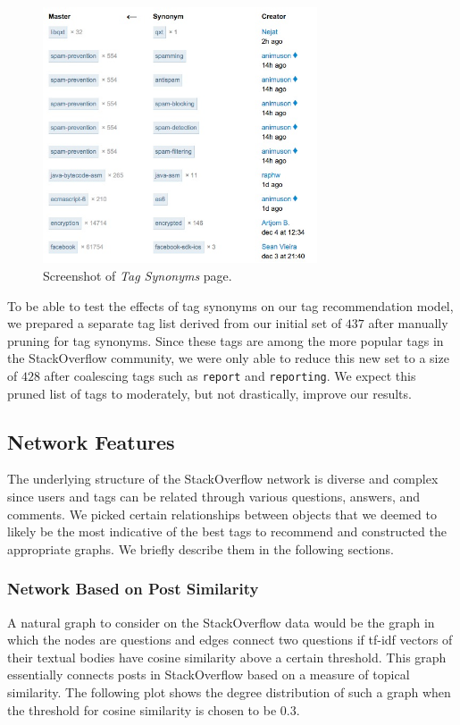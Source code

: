 \documentclass[10pt]{IEEEtran}
\begin{document}
\begin{figure}[h]
  \centering
    \includegraphics[width=3.2in]{tagsynonyms_so.jpg}
  \caption{Screenshot of \textit{Tag Synonyms} page.}
  \label{fig:syn}
\end{figure}

To be able to test the effects of tag synonyms on our tag recommendation model, we prepared a separate tag list derived from our initial set of $437$ after manually pruning for tag synonyms. Since these tags are among the more popular tags in the StackOverflow community, we were only able to reduce this new set to a size of $428$ after coalescing tags such as \texttt{report} and \texttt{reporting}. We expect this pruned list of tags to moderately, but not drastically, improve our results.

\subsection{Network Features}

The underlying structure of the StackOverflow network is diverse and complex since users and tags can be related through various questions, answers, and comments. We picked certain relationships between objects that we deemed to likely be the most indicative of the best tags to recommend and constructed the appropriate graphs. We briefly describe them in the following sections.

\subsubsection{Network Based on Post Similarity}

A natural graph to consider on the StackOverflow data would be the graph in which the nodes are questions and edges connect two questions if tf-idf vectors of their textual bodies have cosine similarity above a certain threshold. This graph essentially connects posts in StackOverflow based on a measure of topical similarity. The following plot shows the degree distribution of such a graph when the threshold for cosine similarity is chosen to be $0.3$.
\end{document}
